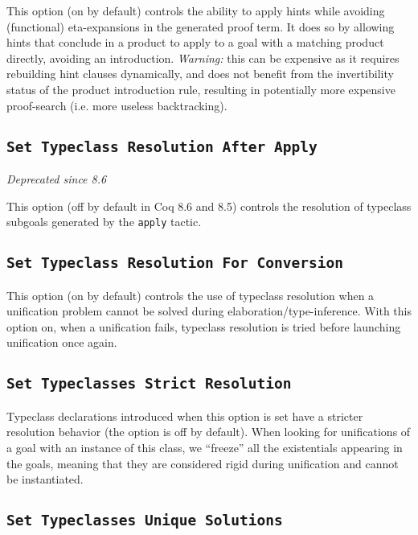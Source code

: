 This option (on by default) controls the ability to
apply hints while avoiding (functional) eta-expansions in the generated
proof term. It does so by allowing hints that conclude in a product to
apply to a goal with a matching product directly, avoiding an
introduction. \emph{Warning:} this can be expensive as it requires
rebuilding hint clauses dynamically, and does not benefit from the
invertibility status of the product introduction rule, resulting in
potentially more expensive proof-search (i.e. more useless
backtracking).

\subsection{\tt Set Typeclass Resolution After Apply}
\emph{Deprecated since 8.6}

This option (off by default in Coq 8.6 and 8.5) controls the resolution
of typeclass subgoals generated by the {\tt apply} tactic.

\subsection{\tt Set Typeclass Resolution For Conversion}

This option (on by default) controls the use of typeclass resolution
when a unification problem cannot be solved during
elaboration/type-inference. With this option on, when a unification
fails, typeclass resolution is tried before launching unification once again.

\subsection{\tt Set Typeclasses Strict Resolution}

Typeclass declarations introduced when this option is set have a
stricter resolution behavior (the option is off by default). When
looking for unifications of a goal with an instance of this class, we
``freeze'' all the existentials appearing in the goals, meaning that
they are considered rigid during unification and cannot be instantiated.

\subsection{\tt Set Typeclasses Unique Solutions}

